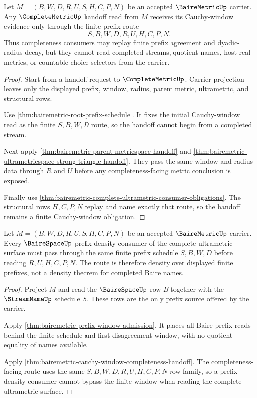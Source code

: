 \begin{theorem}
\label{thm:bairemetric-cauchy-window-completeness-handoff}
Let $M=(B,W,D,R,U,S,H,C,P,N)$ be an accepted $\BaireMetricUp$ carrier. Any $\CompleteMetricUp$ handoff read from $M$ receives its Cauchy-window evidence only through the finite prefix route
$$
S,B,W,D,R,U,H,C,P,N .
$$
Thus completeness consumers may replay finite prefix agreement and dyadic-radius decay, but they cannot read completed streams, quotient names, host real metrics, or countable-choice selectors from the carrier.
\end{theorem}
\begin{proof}
Start from a handoff request to $\CompleteMetricUp$. Carrier projection leaves only the displayed prefix, window, radius, parent metric, ultrametric, and structural rows.

Use \autoref{thm:bairemetric-root-prefix-schedule}. It fixes the initial Cauchy-window read as the finite $S,B,W,D$ route, so the handoff cannot begin from a completed stream.

Next apply \autoref{thm:bairemetric-parent-metricspace-handoff} and \autoref{thm:bairemetric-ultrametricspace-strong-triangle-handoff}. They pass the same window and radius data through $R$ and $U$ before any completeness-facing metric conclusion is exposed.

Finally use \autoref{thm:bairemetric-complete-ultrametric-consumer-obligations}. The structural rows $H,C,P,N$ replay and name exactly that route, so the handoff remains a finite Cauchy-window obligation.
\end{proof}

\begin{theorem}
\label{thm:bairemetric-bairespace-prefix-density-route}
Let $M=(B,W,D,R,U,S,H,C,P,N)$ be an accepted $\BaireMetricUp$ carrier. Every $\BaireSpaceUp$ prefix-density consumer of the complete ultrametric surface must pass through the same finite prefix schedule $S,B,W,D$ before reading $R,U,H,C,P,N$. The route is therefore density over displayed finite prefixes, not a density theorem for completed Baire names.
\end{theorem}
\begin{proof}
Project $M$ and read the $\BaireSpaceUp$ row $B$ together with the $\StreamNameUp$ schedule $S$. These rows are the only prefix source offered by the carrier.

Apply \autoref{thm:bairemetric-prefix-window-admission}. It places all Baire prefix reads behind the finite schedule and first-disagreement window, with no quotient equality of names available.

Apply \autoref{thm:bairemetric-cauchy-window-completeness-handoff}. The completeness-facing route uses the same $S,B,W,D,R,U,H,C,P,N$ row family, so a prefix-density consumer cannot bypass the finite window when reading the complete ultrametric surface.
\end{proof}

